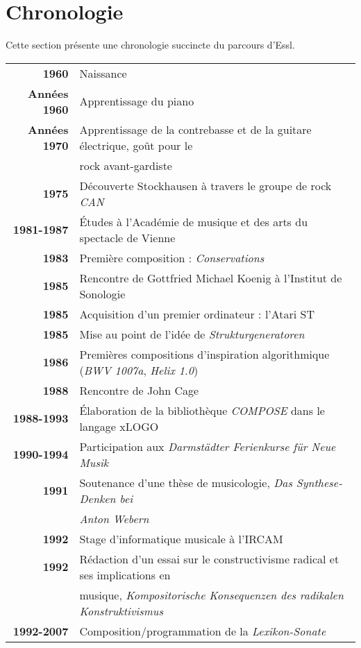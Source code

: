 \documentclass[a4paper,12pt]{article}
\begin{document}
\newpage
\section{Chronologie}

Cette section présente une chronologie succincte du parcours d'Essl.

\begin{tabular}{rl}
\textbf{1960} & Naissance \\
\textbf{Années 1960} & Apprentissage du piano \\
\textbf{Années 1970} & Apprentissage de la contrebasse et de la guitare électrique, goût pour le \\ & rock avant-gardiste \\
\textbf{1975} & Découverte Stockhausen à travers le groupe de rock \emph{CAN} \\
\textbf{1981-1987} & Études à l'Académie de musique et des arts du spectacle de Vienne \\
\textbf{1983} & Première composition : \emph{Conservations} \\
\textbf{1985} & Rencontre de Gottfried Michael Koenig à l'Institut de Sonologie \\
\textbf{1985} & Acquisition d'un premier ordinateur : l'Atari ST \\
\textbf{1985} & Mise au point de l'idée de \emph{Strukturgeneratoren} \\
\textbf{1986} & Premières compositions d'inspiration algorithmique (\emph{BWV 1007a}, \emph{Helix 1.0}) \\
\textbf{1988} & Rencontre de John Cage \\
\textbf{1988-1993} & Élaboration de la bibliothèque \emph{COMPOSE} dans le langage xLOGO \\
\textbf{1990-1994} & Participation aux \emph{Darmstädter Ferienkurse für Neue Musik} \\
\textbf{1991} & Soutenance d'une thèse de musicologie, \emph{Das Synthese-Denken bei} \\ & \emph{Anton Webern} \\
\textbf{1992} & Stage d'informatique musicale à l'IRCAM \\
\textbf{1992} & Rédaction d'un essai sur le constructivisme radical et ses implications en \\ & musique, \emph{Kompositorische Konsequenzen des radikalen Konstruktivismus} \\
\textbf{1992-2007} & Composition/programmation de la \emph{Lexikon-Sonate} \\

\end{tabular}
\end{document}
